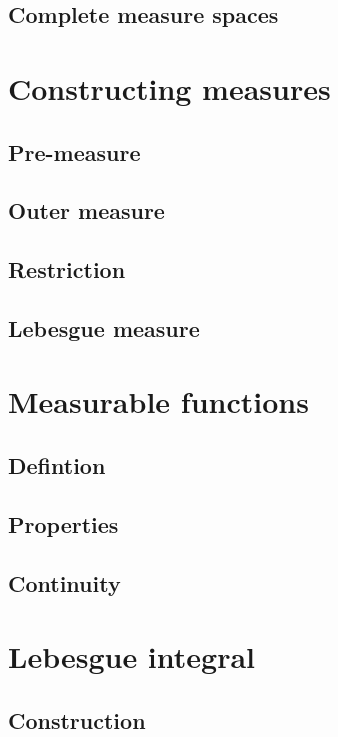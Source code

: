 \documentclass[../Year2.tex]{subfiles}
\begin{document}
\subsection{Complete measure spaces}

\section{Constructing measures}

\subsection{Pre-measure}

\subsection{Outer measure}

\subsection{Restriction}

\subsection{Lebesgue measure}

\section{Measurable functions}

\subsection{Defintion}

\subsection{Properties}

\subsection{Continuity}

\section{Lebesgue integral}

\subsection{Construction}
\end{document}

